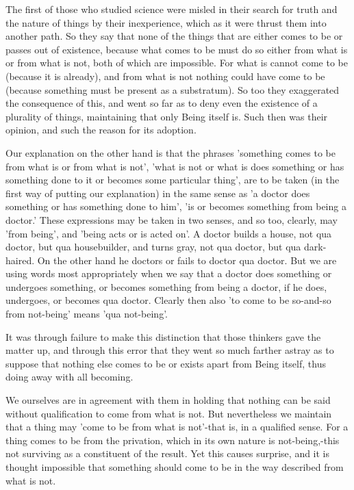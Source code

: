 The first of those who studied science were misled in their search
for truth and the nature of things by their inexperience, which as
it were thrust them into another path. So they say that none of the
things that are either comes to be or passes out of existence, because
what comes to be must do so either from what is or from what is not,
both of which are impossible. For what is cannot come to be (because
it is already), and from what is not nothing could have come to be
(because something must be present as a substratum). So too they exaggerated
the consequence of this, and went so far as to deny even the existence
of a plurality of things, maintaining that only Being itself is. Such
then was their opinion, and such the reason for its adoption.

Our explanation on the other hand is that the phrases 'something comes
to be from what is or from what is not', 'what is not or what is does
something or has something done to it or becomes some particular thing',
are to be taken (in the first way of putting our explanation) in the
same sense as 'a doctor does something or has something done to him',
'is or becomes something from being a doctor.' These expressions may
be taken in two senses, and so too, clearly, may 'from being', and
'being acts or is acted on'. A doctor builds a house, not qua doctor,
but qua housebuilder, and turns gray, not qua doctor, but qua dark-haired.
On the other hand he doctors or fails to doctor qua doctor. But we
are using words most appropriately when we say that a doctor does
something or undergoes something, or becomes something from being
a doctor, if he does, undergoes, or becomes qua doctor. Clearly then
also 'to come to be so-and-so from not-being' means 'qua not-being'.

It was through failure to make this distinction that those thinkers
gave the matter up, and through this error that they went so much
farther astray as to suppose that nothing else comes to be or exists
apart from Being itself, thus doing away with all becoming.

We ourselves are in agreement with them in holding that nothing can
be said without qualification to come from what is not. But nevertheless
we maintain that a thing may 'come to be from what is not'-that is,
in a qualified sense. For a thing comes to be from the privation,
which in its own nature is not-being,-this not surviving as a constituent
of the result. Yet this causes surprise, and it is thought impossible
that something should come to be in the way described from what is
not. 

